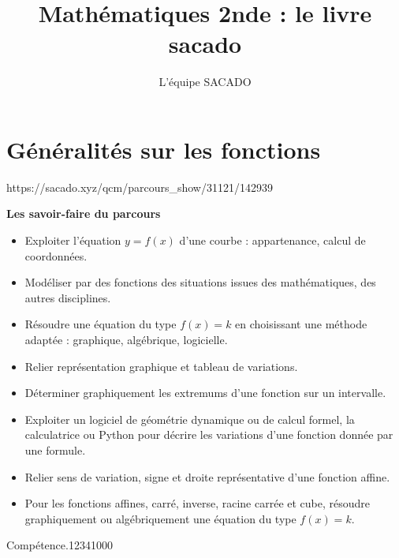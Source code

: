 


\usepackage{tkz-tab}

\title{Mathématiques 2nde  : le livre sacado}
\author{L'équipe SACADO}




\chapter{Généralités sur les fonctions}
{https://sacado.xyz/qcm/parcours_show/31121/142939}
{
 \begin{CpsCol}
	\textbf{Les savoir-faire du parcours}
 	\begin{itemize}
		\item Exploiter l'équation $y = f(x)$ d'une courbe : appartenance, calcul de coordonnées.
		\item  Modéliser par des fonctions des situations issues des mathématiques, des autres disciplines.
		\item Résoudre une équation du type $f(x) = k$ en choisissant une méthode adaptée :
graphique, algébrique, logicielle.
		\item Relier représentation graphique et tableau de variations.
		\item Déterminer graphiquement les extremums d'une fonction sur un intervalle.
		\item Exploiter un logiciel de géométrie dynamique ou de calcul formel, la calculatrice ou Python pour décrire
les variations d'une fonction donnée par une formule.
		\item Relier sens de variation, signe et droite représentative d'une fonction affine.
		\item Pour les fonctions affines, carré, inverse, racine carrée et cube, résoudre graphiquement ou algébriquement
une équation du type $f(x) = k$.
 	\end{itemize}
 \end{CpsCol}

\begin{His}
\end{His}

\begin{ExoDec}{Compétence.}{1234}{1}{0}{0}{0}
\end{ExoDec}
}


